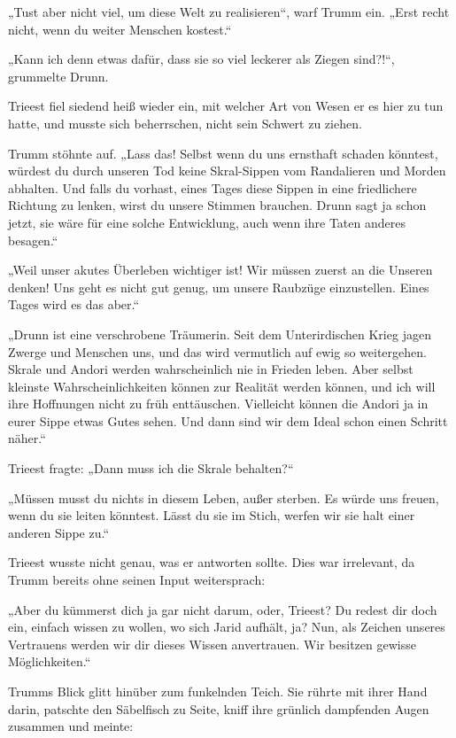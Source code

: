„Tust aber nicht viel, um diese Welt zu realisieren“, warf Trumm ein. „Erst recht nicht, wenn du weiter Menschen kostest.“

„Kann ich denn etwas dafür, dass sie so viel leckerer als Ziegen sind?!“, grummelte Drunn.

Trieest fiel siedend heiß wieder ein, mit welcher Art von Wesen er es hier zu tun hatte, und musste sich beherrschen, nicht sein Schwert zu ziehen.

Trumm stöhnte auf. „Lass das! Selbst wenn du uns ernsthaft schaden könntest, würdest du durch unseren Tod keine Skral-Sippen vom Randalieren und Morden abhalten. Und falls du vorhast, eines Tages diese Sippen in eine friedlichere Richtung zu lenken, wirst du unsere Stimmen brauchen. Drunn sagt ja schon jetzt, sie wäre für eine solche Entwicklung, auch wenn ihre Taten anderes besagen.“

„Weil unser akutes Überleben wichtiger ist! Wir müssen zuerst an die Unseren denken! Uns geht es nicht gut genug, um unsere Raubzüge einzustellen. Eines Tages wird es das aber.“

„Drunn ist eine verschrobene Träumerin. Seit dem Unterirdischen Krieg jagen Zwerge und Menschen uns, und das wird vermutlich auf ewig so weitergehen. Skrale und Andori werden wahrscheinlich nie in Frieden leben. Aber selbst kleinste Wahrscheinlichkeiten können zur Realität werden können, und ich will ihre Hoffnungen nicht zu früh enttäuschen. Vielleicht können die Andori ja in eurer Sippe etwas Gutes sehen. Und dann sind wir dem Ideal schon einen Schritt näher.“

Trieest fragte: „Dann muss ich die Skrale behalten?“

„Müssen musst du nichts in diesem Leben, außer sterben. Es würde uns freuen, wenn du sie leiten könntest. Lässt du sie im Stich, werfen wir sie halt einer anderen Sippe zu.“

Trieest wusste nicht genau, was er antworten sollte. Dies war irrelevant, da Trumm bereits ohne seinen Input weitersprach:

„Aber du kümmerst dich ja gar nicht darum, oder, Trieest? Du redest dir doch ein, einfach wissen zu wollen, wo sich Jarid aufhält, ja? Nun, als Zeichen unseres Vertrauens werden wir dir dieses Wissen anvertrauen. Wir besitzen gewisse Möglichkeiten.“

Trumms Blick glitt hinüber zum funkelnden Teich. Sie rührte mit ihrer Hand darin, patschte den Säbelfisch zu Seite, kniff ihre grünlich dampfenden Augen zusammen und meinte:

